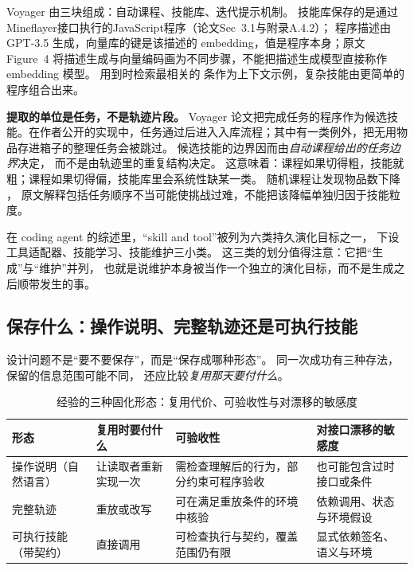 Voyager 由三块组成：自动课程、技能库、迭代提示机制\cite{voyager-2305}。
技能库保存的是通过Mineflayer接口执行的JavaScript程序（论文Sec~3.1与附录A.4.2）\cite{voyager-2305}；
程序描述由 GPT-3.5 生成，向量库的键是该描述的 embedding，值是程序本身；原文 Figure~4 将描述生成与向量编码画为不同步骤，不能把描述生成模型直接称作 embedding 模型。
用到时检索最相关的  条作为上下文示例，复杂技能由更简单的程序组合出来\cite{voyager-2305}。

\begin{principlebox}
\textbf{提取的单位是任务，不是轨迹片段。}
Voyager 论文把完成任务的程序作为候选技能。在作者公开的实现中，任务通过后进入入库流程；其中有一类例外，把无用物品存进箱子的整理任务会被跳过\cite{voyager-code-55e45a8}。
候选技能的边界因而由\emph{自动课程给出的任务边界}决定，
而不是由轨迹里的重复结构决定。
这意味着：课程如果切得粗，技能就粗；课程如果切得偏，技能库里会系统性缺某一类。
随机课程让发现物品数下降 \cite{voyager-2305}，
原文解释包括任务顺序不当可能使挑战过难，不能把该降幅单独归因于技能粒度。
\end{principlebox}

在 coding agent 的综述里，``skill and tool''被列为六类持久演化目标之一，
下设工具适配器、技能学习、技能维护三小类\cite{coding-survey-2608}。
这三类的划分值得注意：它把``生成''与``维护''并列，
也就是说维护本身被当作一个独立的演化目标，而不是生成之后顺带发生的事。

\subsection{保存什么：操作说明、完整轨迹还是可执行技能}
\label{sec:ch08-forms}

设计问题不是``要不要保存''，而是``保存成哪种形态''。
同一次成功有三种存法，保留的信息范围可能不同，
还应比较\emph{复用那天要付什么}。

\begin{table}[htbp]
\centering
\caption{经验的三种固化形态：复用代价、可验收性与对漂移的敏感度}
\label{tab:ch08-forms}
\begin{tabular}{>{\raggedright\arraybackslash}p{2.6cm}>{\raggedright\arraybackslash}p{3.0cm}>{\raggedright\arraybackslash}p{3.1cm}>{\raggedright\arraybackslash}p{3.0cm}}
\toprule
形态 & 复用时要付什么 & 可验收性 & 对接口漂移的敏感度 \\
\midrule
操作说明（自然语言） & 让读取者重新实现一次 & 需检查理解后的行为，部分约束可程序验收 & 也可能包含过时接口或条件 \\
完整轨迹 & 重放或改写 & 可在满足重放条件的环境中核验 & 依赖调用、状态与环境假设 \\
可执行技能（带契约） & 直接调用 & 可检查执行与契约，覆盖范围仍有限 & 显式依赖签名、语义与环境 \\
\bottomrule
\end{tabular}
\end{table}

